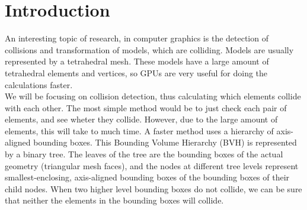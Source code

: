 \section{Introduction}
An interesting topic of research, in computer graphics is the detection of collisions and transformation of models, which are colliding. Models are usually represented by a tetrahedral mesh. These models have a large amount of tetrahedral elements and vertices, so GPUs are very useful for doing the calculations faster.\\
We will be focusing on collision detection, thus calculating which elements collide with each other. The most simple method would be to just check each pair of elements, and see wheter they collide. However, due to the large amount of elements, this will take to much time. A faster method uses a hierarchy of axis-aligned bounding boxes. This Bounding Volume Hierarchy (BVH) is represented by a binary tree. The leaves of the tree are the bounding boxes of the actual geometry (triangular mesh faces), and the nodes at different tree levels represent smallest-enclosing, axis-aligned bounding boxes of the bounding boxes of their child nodes. When two higher level bounding boxes do not collide, we can be sure that neither the elements in the bounding boxes will collide.\\

